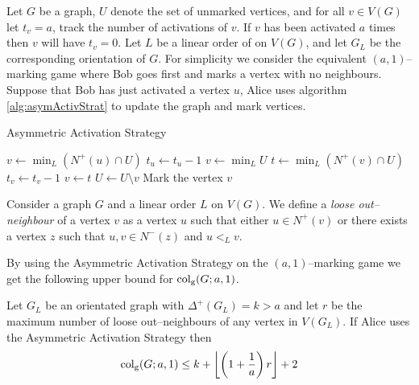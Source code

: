 \begin{definition} 
    Let $G$ be a graph, $U$ denote the set of unmarked vertices, and for all $v\in V(G)$ let $t_v=a$, track the number of activations of $v$. If $v$ has been activated $a$ times then $v$ will have $t_v=0$. Let $L$ be a linear order of on $V(G)$, and let $G_L$ be the corresponding orientation of $G$. %
    For simplicity we consider the equivalent $(a,1)$--marking game where Bob goes first and marks a vertex with no neighbours. Suppose that Bob has just activated a vertex $u$, Alice uses algorithm \ref{alg:asymActivStrat} to update the graph and mark vertices.
    \begin{algorithm}[h]
        \caption{Asymmetric Activation Strategy}
        \label{alg:asymActivStrat}
        \begin{algorithmic}[1]
            \Statex
                    \State $v\gets \min_L (N^+(u)\cap U)$ %
                    \State $t_u \gets t_u-1$
                    \Else 
                    \State $v\gets \min_L U$                  
                \EndIf
                    \State $t\gets \min_L (N^+(v)\cap U)$ %
                    \State $t_v \gets t_v-1$
                    \State $v\gets t$
                \EndWhile
                \State $U \gets U \setminus v$
                \State Mark the vertex $v$
            \EndFor
        \end{algorithmic}
    \end{algorithm}
\end{definition}


Consider a graph $G$ and a linear order $L$ on $V(G)$. We define a \textit{loose out--neighbour} of a vertex $v$ as a vertex $u$ such that either $u\in N^+(v)$ or there exists a vertex $z$ such that $u,v\in N^-(z)$ and $u<_L v$.

By using the Asymmetric Activation Strategy on the $(a,1)$--marking game we get the following upper bound for $\operatorname{col_g}(G;a,1)$.

\begin{theorem}  %
    Let $G_L$ be an orientated graph with $\Delta^+(G_L)=k>a$ and let $r$ be the maximum number of loose out--neighbours of any vertex in $V(G_L)$. If Alice uses the Asymmetric Activation Strategy then \[\operatorname{col_g}(G;a,1)\leq k+\left\lfloor \left(1+\frac{1}{a}\right)r \right\rfloor +2\]
\end{theorem}

